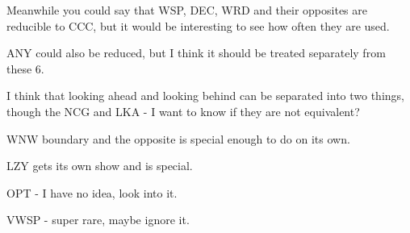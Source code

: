 Meanwhile you could say that WSP, DEC, WRD and their opposites are reducible to CCC, but it would be interesting to see how often they are used.

ANY could also be reduced, but I think it should be treated separately from these 6.

I think that looking ahead and looking behind can be separated into two things, though the NCG and LKA - I want to know if they are not equivalent?

WNW boundary and the opposite is special enough to do on its own.

LZY gets its own show and is special.

OPT - I have no idea, look into it.

VWSP - super rare, maybe ignore it.









